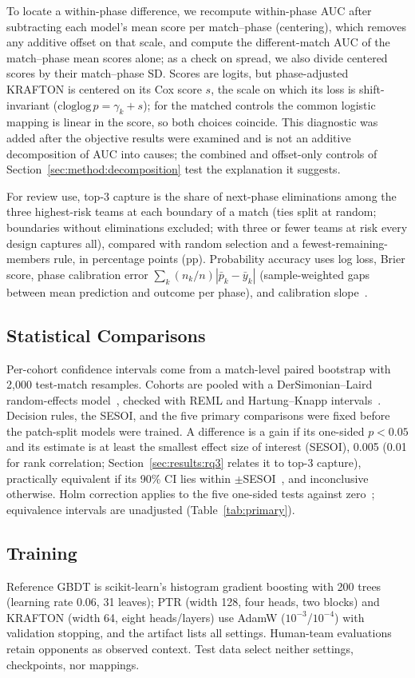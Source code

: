 \documentclass[sigconf,anonymous,nonacm]{acmart}
\begin{document}
To locate a within-phase difference, we recompute within-phase AUC after subtracting each model's mean score per match--phase (centering), which removes any additive offset on that scale, and compute the different-match AUC of the match--phase mean scores alone; as a check on spread, we also divide centered scores by their match--phase SD. Scores are logits, but phase-adjusted KRAFTON is centered on its Cox score $s$, the scale on which its loss is shift-invariant ($\mathrm{cloglog}\,p=\gamma_k+s$); for the matched controls the common logistic mapping is linear in the score, so both choices coincide. This diagnostic was added after the objective results were examined and is not an additive decomposition of AUC into causes; the combined and offset-only controls of Section~\ref{sec:method:decomposition} test the explanation it suggests.

For review use, top-3 capture is the share of next-phase eliminations among the three highest-risk teams at each boundary of a match (ties split at random; boundaries without eliminations excluded; with three or fewer teams at risk every design captures all), compared with random selection and a fewest-remaining-members rule, in percentage points (pp). Probability accuracy uses log loss, Brier score, phase calibration error $\sum_k(n_k/n)|\bar p_k-\bar y_k|$ (sample-weighted gaps between mean prediction and outcome per phase), and calibration slope~\cite{VanCalster16}.

\subsection{Statistical Comparisons}
Per-cohort confidence intervals come from a match-level paired bootstrap with 2,000 test-match resamples.
Cohorts are pooled with a DerSimonian--Laird random-effects model~\cite{DerSimonian86}, checked with REML and Hartung--Knapp intervals~\cite{HartungKnapp01}.
Decision rules, the SESOI, and the five primary comparisons were fixed before the patch-split models were trained. A difference is a gain if its one-sided $p<0.05$ and its estimate is at least the smallest effect size of interest (SESOI), 0.005 (0.01 for rank correlation; Section~\ref{sec:results:rq3} relates it to top-3 capture), practically equivalent if its 90\% CI lies within $\pm$SESOI~\cite{Schuirmann87}, and inconclusive otherwise.
Holm correction applies to the five one-sided tests against zero~\cite{Holm79}; equivalence intervals are unadjusted (Table~\ref{tab:primary}).

\subsection{Training}
Reference GBDT is scikit-learn's histogram gradient boosting with 200 trees (learning rate 0.06, 31 leaves); PTR (width 128, four heads, two blocks) and KRAFTON (width 64, eight heads/layers) use AdamW ($10^{-3}$/$10^{-4}$) with validation stopping, and the artifact lists all settings. Human-team evaluations retain opponents as observed context. Test data select neither settings, checkpoints, nor mappings.
\end{document}
